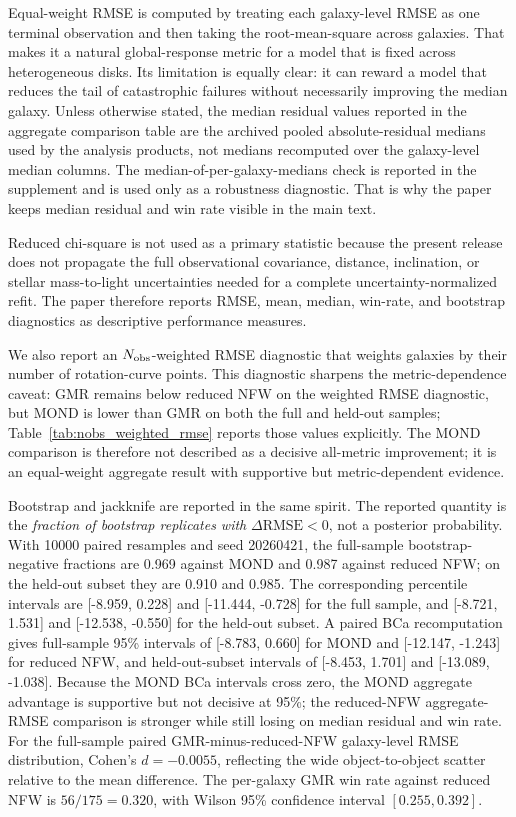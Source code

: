 ﻿\documentclass[twocolumn]{aastex701}
\begin{document}
Equal-weight RMSE is computed by treating each galaxy-level RMSE as one terminal observation and then taking the root-mean-square across galaxies. That makes it a natural global-response metric for a model that is fixed across heterogeneous disks. Its limitation is equally clear: it can reward a model that reduces the tail of catastrophic failures without necessarily improving the median galaxy. Unless otherwise stated, the median residual values reported in the aggregate comparison table are the archived pooled absolute-residual medians used by the analysis products, not medians recomputed over the galaxy-level median columns. The median-of-per-galaxy-medians check is reported in the supplement and is used only as a robustness diagnostic. That is why the paper keeps median residual and win rate visible in the main text.

Reduced chi-square is not used as a primary statistic because the present release does not propagate the full observational covariance, distance, inclination, or stellar mass-to-light uncertainties needed for a complete uncertainty-normalized refit. The paper therefore reports RMSE, mean, median, win-rate, and bootstrap diagnostics as descriptive performance measures.

We also report an $N_{\rm obs}$-weighted RMSE diagnostic that weights galaxies by their number of rotation-curve points. This diagnostic sharpens the metric-dependence caveat: GMR remains below reduced NFW on the weighted RMSE diagnostic, but MOND is lower than GMR on both the full and held-out samples; Table~\ref{tab:nobs_weighted_rmse} reports those values explicitly. The MOND comparison is therefore not described as a decisive all-metric improvement; it is an equal-weight aggregate result with supportive but metric-dependent evidence.

Bootstrap and jackknife are reported in the same spirit. The reported quantity is the \emph{fraction of bootstrap replicates with} $\Delta \mathrm{RMSE} < 0$, not a posterior probability. With 10000 paired resamples and seed 20260421, the full-sample bootstrap-negative fractions are 0.969 against MOND and 0.987 against reduced NFW; on the held-out subset they are 0.910 and 0.985. The corresponding percentile intervals are [-8.959, 0.228] and [-11.444, -0.728] for the full sample, and [-8.721, 1.531] and [-12.538, -0.550] for the held-out subset. A paired BCa recomputation gives full-sample 95\% intervals of [-8.783, 0.660] for MOND and [-12.147, -1.243] for reduced NFW, and held-out-subset intervals of [-8.453, 1.701] and [-13.089, -1.038]. Because the MOND BCa intervals cross zero, the MOND aggregate advantage is supportive but not decisive at 95\%; the reduced-NFW aggregate-RMSE comparison is stronger while still losing on median residual and win rate. For the full-sample paired GMR-minus-reduced-NFW galaxy-level RMSE distribution, Cohen's $d=-0.0055$, reflecting the wide object-to-object scatter relative to the mean difference. The per-galaxy GMR win rate against reduced NFW is $56/175=0.320$, with Wilson 95\% confidence interval $[0.255,0.392]$.
\end{document}
